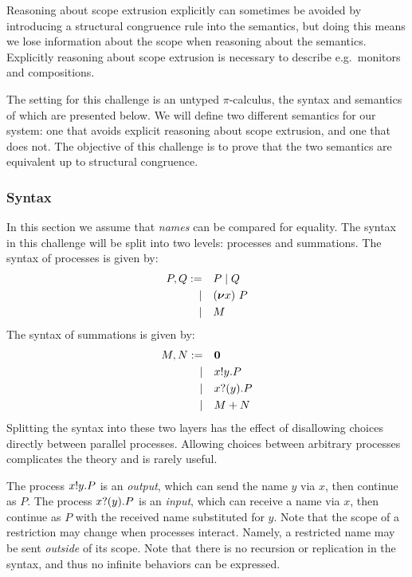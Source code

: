 Reasoning about scope extrusion explicitly can sometimes be avoided by introducing a structural congruence rule into the semantics, but doing this means we lose information about the scope when reasoning about the semantics.
Explicitly reasoning about scope extrusion is necessary to describe e.g.\ monitors and compositions.

The setting for this challenge is an untyped \( \pi \)-calculus, the syntax and semantics of which are presented below.
We will define two different semantics for our system: one that avoids explicit reasoning about scope extrusion, and one that does not.
The objective of this challenge is to prove that the two semantics are equivalent up to structural congruence.

\subsubsection{Syntax}
In this section we assume that \emph{names}  can be compared for equality.
The syntax in this challenge will be split into two levels: processes and summations.
The syntax of processes is given by:
\begin{align*}
  P,Q :=&&& P \mid Q \\
  |&&& (\bm{\nu} x)~P \\
  |&&& M
\end{align*}
The syntax of summations is given by:
\begin{align*}
  M,N :=&&& \bm{0} \\
  |&&& x ! y . P \\
  |&&& x ? (y) . P \\
  |&&& M + N
\end{align*}
Splitting the syntax into these two layers has the effect of disallowing choices directly between parallel processes.
Allowing choices between arbitrary processes complicates the theory and is rarely useful.

The process \( x ! y . P \) is an \emph{output}, which can send the name \( y \) via \( x \), then continue as \( P \).
The process \( x ? (y) . P \) is an \emph{input}, which can receive a name via \( x \), then continue as \( P \) with the received name substituted for \( y \).
Note that the scope of a restriction may change when processes interact. Namely, a restricted name may be sent \emph{outside} of its scope.
Note that there is no recursion or replication in the syntax, and thus no infinite behaviors can be expressed.

